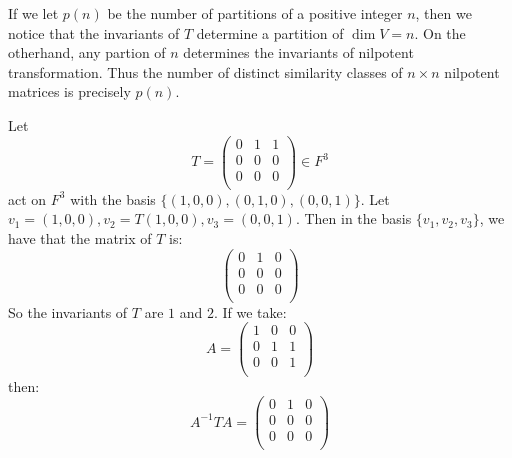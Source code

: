 \begin{remark}
    If we let $p(n)$ be the number of partitions of a positive integer $n$,
    then we notice that the invariants of  $T$ determine a partition of
    $\dim{V}=n$. On the otherhand, any partion of $n$ determines the invariants
    of nilpotent transformation. Thus the number of distinct similarity classes
    of $n \times n$ nilpotent matrices is precisely $p(n)$.
\end{remark}

\begin{example}
    Let
    \begin{equation*}
        T=\begin{pmatrix}
                0   &   1   &   1   \\
                0   &   0   &   0   \\
                0   &   0   &   0   \\
          \end{pmatrix} \in F^3
    \end{equation*}
    act on $F^3$ with the basis  $\{(1,0,0),(0,1,0),(0,0,1)\}$. Let
    $v_1=(1,0,0), v_2=T(1,0,0), v_3=(0,0,1)$. Then in the basis $\{v_1, v_2,
    v_3\}$, we have that the matrix of $T$ is:
    \begin{equation*}
        \begin{pmatrix}
            0   &   1   &   0   \\
            0   &   0   &   0   \\
            0   &   0   &   0   \\
        \end{pmatrix}
    \end{equation*}
    So the invariants of $T$ are $1$ and $2$. If we take:
    \begin{equation*}
        A=\begin{pmatrix}
                1   &   0   &   0   \\
                0   &   1   &   1   \\
                0   &   0   &   1   \\
          \end{pmatrix}
    \end{equation*}
    then:
    \begin{equation*}
        A^{-1}TA=\begin{pmatrix}
                    0   &   1   &   0   \\
                    0   &   0   &   0   \\
                    0   &   0   &   0   \\
                \end{pmatrix}
    \end{equation*}
\end{example}

